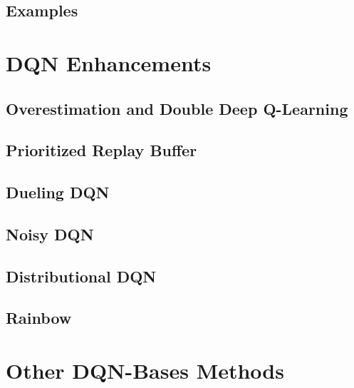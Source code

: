         \subsection{Examples} %

    \section{DQN Enhancements} %

        \subsection{Overestimation and Double Deep Q-Learning} %

        \subsection{Prioritized Replay Buffer} %

        \subsection{Dueling DQN} %

        \subsection{Noisy DQN} %

        \subsection{Distributional DQN} %

        \subsection{Rainbow} %

    \section{Other DQN-Bases Methods} %

